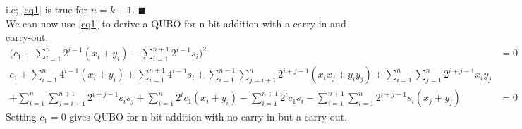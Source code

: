 \documentclass[12pt]{article}
\newcommand*{\QED}{\hfill\ensuremath{\blacksquare}}
\begin{document}
i.e; \ref{eq1} is true for $n=k+1$. \QED \\
We can now use \ref{eq1} to derive a QUBO for n-bit addition with a carry-in and carry-out.
\begin{align*}
\bigg(c_1 + \sum_{i=1}^{n}2^{i-1}(x_i + y_i) - \sum_{i=1}^{n+1}2^{i-1}s_i\bigg)^2 &= 0\\
c_1 + \sum_{i=1}^{n}4^{i-1}(x_i+y_i) 
+ \sum_{i=1}^{n+1}4^{i-1}s_i
+ \sum_{i=1}^{n-1}\sum_{j=i+1}^{n}2^{i+j-1}(x_ix_j+y_iy_j) 
+ \sum_{i=1}^n\sum_{j=1}^n2^{i+j-1}x_iy_j \\
+ \sum_{i=1}^n\sum_{j=i+1}^{n+1}2^{i+j-1}s_is_j
+ \sum_{i=1}^n2^ic_1(x_i+y_i)
- \sum_{i=1}^{n+1}2^ic_1s_i
- \sum_{i=1}^{n+1}\sum_{i=1}^n2^{i+j-1}s_i(x_j+y_j)
&= 0
\end{align*}
Setting $c_1=0$ gives QUBO for n-bit addition with no carry-in but a carry-out.
\end{document}
